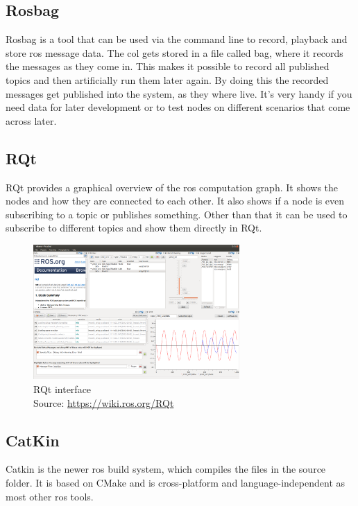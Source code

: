 \subsection{Rosbag}
Rosbag is a tool that can be used via the command line to record, playback and store \gls{ros} message data. The col gets stored in a file called bag, where it records the messages as they come in. This makes it possible to record all published topics and then artificially run them later again. By doing this the recorded messages get published into the system, as they where live. It's very handy if you need data for later development or to test nodes on different scenarios that come across later.

\subsection{RQt}\label{rqt}
RQt provides a graphical overview of the \gls{ros} computation graph. It shows the nodes and how they are connected to each other. It also shows if a node is even subscribing to a topic or publishes something. Other than that it can be used to subscribe to different topics and show them directly in RQt.
\begin{figure}[h]
	\centering
	\includegraphics[width=0.7\textwidth]{./media/images/RQt}
  	\caption{RQt interface\\Source: \url{https://wiki.ros.org/RQt}}
  	\label{rqtinterface}
\end{figure}

\subsection{CatKin}\label{catkin}
Catkin is the newer \gls{ros} build system, which compiles the files in the source folder. It is based on CMake and is cross-platform and language-independent as most other \gls{ros} tools.

